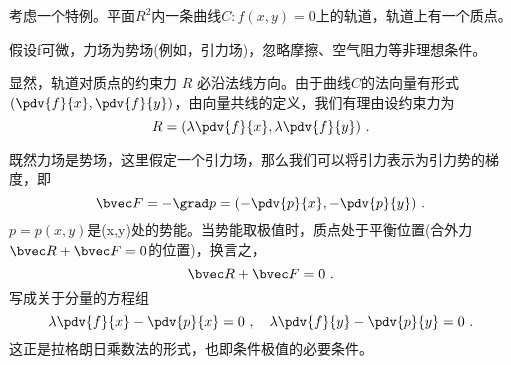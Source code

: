 考虑一个特例。平面$R^2$内一条曲线$C:f(x,y)=0$上的轨道，轨道上有一个质点。

假设f可微，力场为势场(例如，引力场)，忽略摩擦、空气阻力等非理想条件。

显然，轨道对质点的约束力 $R$ 必沿法线方向。由于曲线$C$的法向量有形式$(\pdv{f}{x},\pdv{f}{y})$，由向量共线的定义，我们有理由设约束力为
\begin{equation}
R =(\lambda\pdv{f}{x},\lambda\pdv{f}{y})~.
\end{equation}

既然力场是势场，这里假定一个引力场，那么我们可以将引力表示为引力势的梯度，即
\begin{equation}
\bvec F =-\grad p = (-\pdv{p}{x},-\pdv{p}{y})~.
\end{equation}
$p=p(x,y)$是(x,y)处的势能。当势能取极值时，质点处于平衡位置(合外力$\bvec R+\bvec F=0$的位置)，换言之，
\begin{equation}
\bvec R + \bvec F = 0 ~.
\end{equation}
写成关于分量的方程组
\begin{equation}
\lambda\pdv{f}{x}  -\pdv{p}{x} = 0~, \quad
\lambda\pdv{f}{y}  -\pdv{p}{y} = 0 ~.
\end{equation}
这正是拉格朗日乘数法的形式，也即条件极值的必要条件。
